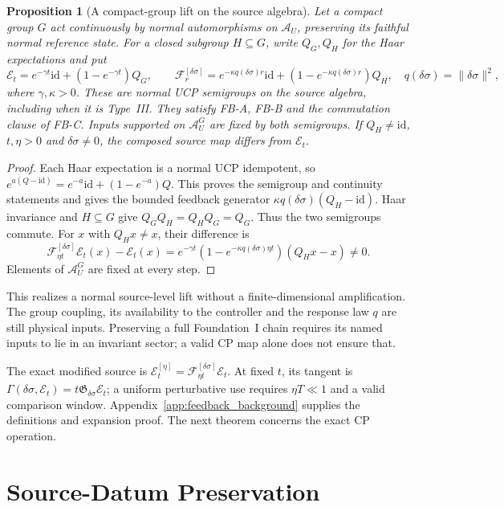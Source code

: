 \documentclass[12pt]{article}
\newtheorem{proposition}[theorem]{Proposition}
\theoremstyle{definition}
\theoremstyle{remark}
\begin{document}
\begin{proposition}[A compact-group lift on the source algebra]
\label{prop:compactlift}
Let a compact group \(G\) act continuously by normal automorphisms on
\(\mathcal A_U\), preserving its faithful normal reference state.
For a closed subgroup \(H\subseteq G\), write \(Q_G,Q_H\) for the Haar
expectations and put
\[
 \mathcal E_t=e^{-\gamma t}\mathrm{id}+(1-e^{-\gamma t})Q_G,\qquad
 \mathscr F_r^{[\delta\sigma]}
 =e^{-\kappa q(\delta\sigma)r}\mathrm{id}
   +(1-e^{-\kappa q(\delta\sigma)r})Q_H,
 \quad q(\delta\sigma)=\|\delta\sigma\|^2 ,
\]
where \(\gamma,\kappa>0\). These are normal UCP semigroups on the
source algebra, including when it is Type~III. They satisfy FB-A,
FB-B and the commutation clause of FB-C. Inputs supported on
\(\mathcal A_U^G\) are fixed by both semigroups.
If \(Q_H\ne\mathrm{id}\), \(t,\eta>0\) and \(\delta\sigma\ne0\),
the composed source map differs from \(\mathcal E_t\).
\end{proposition}
\begin{proof}
Each Haar expectation is a normal UCP idempotent, so
\(e^{a(Q-\mathrm{id})}=e^{-a}\mathrm{id}+(1-e^{-a})Q\).
This proves the semigroup and continuity statements and gives the
bounded feedback generator
\(\kappa q(\delta\sigma)(Q_H-\mathrm{id})\).
Haar invariance and \(H\subseteq G\) give
\(Q_GQ_H=Q_HQ_G=Q_G\). Thus the two semigroups commute.
For \(x\) with \(Q_Hx\ne x\), their difference is
\[
 \mathscr F_{\eta t}^{[\delta\sigma]}\mathcal E_t(x)-\mathcal E_t(x)
 =e^{-\gamma t}(1-e^{-\kappa q(\delta\sigma)\eta t})(Q_Hx-x)\ne0 .
\]
Elements of \(\mathcal A_U^G\) are fixed at every step.
\end{proof}

This realizes a normal source-level lift without a finite-dimensional
amplification. The group coupling, its availability to the controller
and the response law \(q\) are still physical inputs.
Preserving a full Foundation~I chain requires its named inputs to
lie in an invariant sector; a valid CP map alone does not ensure that.

The exact modified source is
$\mathcal E_t^{[\eta]}=\mathscr F_{\eta t}^{[\delta\sigma]}\mathcal E_t$.
At fixed $t$, its tangent is
$\Gamma(\delta\sigma,\mathcal E_t)=t\mathfrak G_{\delta\sigma}\mathcal E_t$;
a uniform perturbative use requires $\eta T\ll1$ and a valid comparison
window. Appendix~\ref{app:feedback_background} supplies the definitions
and expansion proof. The next theorem concerns the exact CP operation.

\section{Source-Datum Preservation}\label{sec:preservation}
\end{document}
